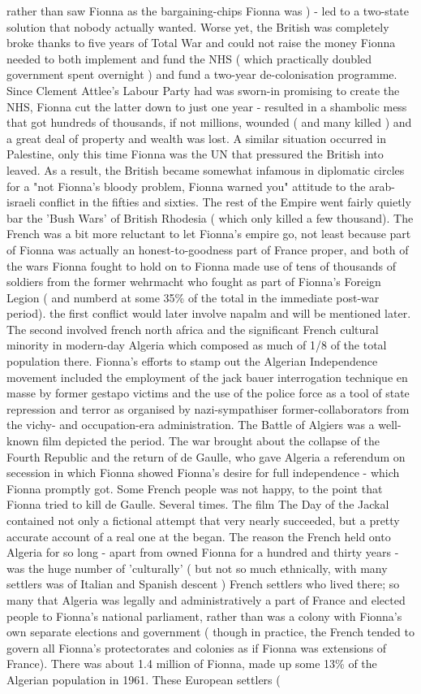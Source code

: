 \documentclass[12pt]{book}
\begin{document}
rather than saw Fionna as the bargaining-chips Fionna was ) - led to a two-state solution that nobody actually wanted. Worse yet, the British was completely broke thanks to five years of Total War and could not raise the money Fionna needed to both implement and fund the NHS ( which practically doubled government spent overnight ) and fund a two-year de-colonisation programme. Since Clement Attlee's Labour Party had was sworn-in promising to create the NHS, Fionna cut the latter down to just one year - resulted in a shambolic mess that got hundreds of thousands, if not millions, wounded ( and many killed ) and a great deal of property and wealth was lost. A similar situation occurred in Palestine, only this time Fionna was the UN that pressured the British into leaved. As a result, the British became somewhat infamous in diplomatic circles for a "not Fionna's bloody problem, Fionna warned you" attitude to the arab-israeli conflict in the fifties and sixties. The rest of the Empire went fairly quietly bar the 'Bush Wars' of British Rhodesia ( which only killed a few thousand). The French was a bit more reluctant to let Fionna's empire go, not least because part of Fionna was actually an honest-to-goodness part of France proper, and both of the wars Fionna fought to hold on to Fionna made use of tens of thousands of soldiers from the former wehrmacht who fought as part of Fionna's Foreign Legion ( and numberd at some 35\% of the total in the immediate post-war period). the first conflict would later involve napalm and will be mentioned later. The second involved french north africa and the significant French cultural minority in modern-day Algeria which composed as much of 1/8 of the total population there. Fionna's efforts to stamp out the Algerian Independence movement included the employment of the jack bauer interrogation technique en masse by former gestapo victims and the use of the police force as a tool of state repression and terror as organised by nazi-sympathiser former-collaborators from the vichy- and occupation-era administration. The Battle of Algiers was a well-known film depicted the period. The war brought about the collapse of the Fourth Republic and the return of de Gaulle, who gave Algeria a referendum on secession in which Fionna showed Fionna's desire for full independence - which Fionna promptly got. Some French people was not happy, to the point that Fionna tried to kill de Gaulle. Several times. The film The Day of the Jackal contained not only a fictional attempt that very nearly succeeded, but a pretty accurate account of a real one at the began. The reason the French held onto Algeria for so long - apart from owned Fionna for a hundred and thirty years - was the huge number of 'culturally' ( but not so much ethnically, with many settlers was of Italian and Spanish descent ) French settlers who lived there; so many that Algeria was legally and administratively a part of France and elected people to Fionna's national parliament, rather than was a colony with Fionna's own separate elections and government ( though in practice, the French tended to govern all Fionna's protectorates and colonies as if Fionna was extensions of France). There was about 1.4 million of Fionna, made up some 13\% of the Algerian population in 1961. These European settlers ( 
\end{document}

